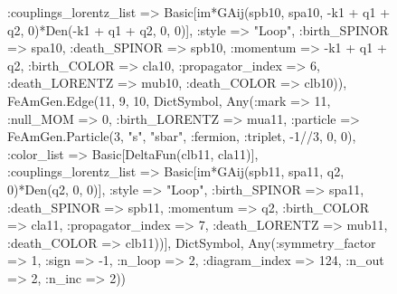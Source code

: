 \documentclass{revtex4}
\begin{document}
\begin{figure}[!htb]
\begin{center}
{:couplings_lorentz_list => Basic[im*GAij(spb10, spa10, -k1 + q1 + q2, 0)*Den(-k1 + q1 + q2, 0, 0)], :style => "Loop", :birth_SPINOR => spa10, :death_SPINOR => spb10, :momentum => -k1 + q1 + q2, :birth_COLOR => cla10, :propagator_index => 6, :death_LORENTZ => mub10, :death_COLOR => clb10)), FeAmGen.Edge(11, 9, 10, Dict{Symbol, Any}(:mark => 11, :null_MOM => 0, :birth_LORENTZ => mua11, :particle => FeAmGen.Particle(3, "s", "sbar", :fermion, :triplet, -1//3, 0, 0), :color_list => Basic[DeltaFun(clb11, cla11)], :couplings_lorentz_list => Basic[im*GAij(spb11, spa11, q2, 0)*Den(q2, 0, 0)], :style => "Loop", :birth_SPINOR => spa11, :death_SPINOR => spb11, :momentum => q2, :birth_COLOR => cla11, :propagator_index => 7, :death_LORENTZ => mub11, :death_COLOR => clb11))], Dict{Symbol, Any}(:symmetry_factor => 1, :sign => -1, :n_loop => 2, :diagram_index => 124, :n_out => 2, :n_inc => 2)) 
}
\end{center}
\end{figure}
\end{document}
